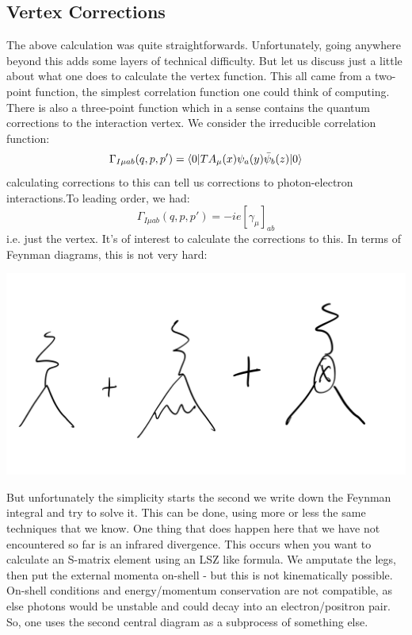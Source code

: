 \subsection{Vertex Corrections}
The above calculation was quite straightforwards. Unfortunately, going anywhere beyond this adds some layers of technical difficulty. But let us discuss just a little about what one does to calculate the vertex function. This all came from a two-point function, the simplest correlation function one could think of computing. There is also a three-point function which in a sense contains the quantum corrections to the interaction vertex. We consider the irreducible correlation function:
\begin{equation}
    \Gamma_{I\mu ab}(q, p, p') = \langle 0 \rvert TA_\mu(x)\psi_a(y)\bar{\psi}_b(z)\lvert 0 \rangle
\end{equation}
calculating corrections to this can tell us corrections to photon-electron interactions.To leading order, we had:
\begin{equation}
    \Gamma_{I\mu ab}(q, p, p') = -ie[\gamma_\mu]_{ab}
\end{equation}
i.e. just the vertex. It's of interest to calculate the corrections to this. In terms of Feynman diagrams, this is not very hard:

\begin{center}
    \includegraphics[scale=0.5]{Images/lec32p3.png}
\end{center}

But unfortunately the simplicity starts the second we write down the Feynman integral and try to solve it. This can be done, using more or less the same techniques that we know. One thing that does happen here that we have not encountered so far is an infrared divergence. This occurs when you want to calculate an S-matrix element using an LSZ like formula. We amputate the legs, then put the external momenta on-shell - but this is not kinematically possible. On-shell conditions and energy/momentum conservation are not compatible, as else photons would be unstable and could decay into an electron/positron pair. So, one uses the second central diagram as a subprocess of something else. 

